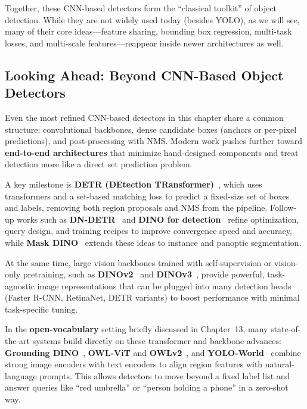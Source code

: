 Together, these CNN-based detectors form the “classical toolkit” of object detection. While they are not widely used today (besides YOLO), as we will see, many of their core ideas—feature sharing, bounding box regression, multi-task losses, and multi-scale features—reappear inside newer architectures as well.

\newpage

\subsection{Looking Ahead: Beyond CNN-Based Object Detectors}
\label{subsec:chapter14_future_object_detection}

Even the most refined CNN-based detectors in this chapter share a common structure: convolutional backbones, dense candidate boxes (anchors or per-pixel predictions), and post-processing with NMS. Modern work pushes further toward \textbf{end-to-end architectures} that minimize hand-designed components and treat detection more like a direct set prediction problem.

A key milestone is \textbf{DETR (DEtection TRansformer)}~\cite{carion2020_detr}, which uses transformers and a set-based matching loss to predict a fixed-size set of boxes and labels, removing both region proposals and NMS from the pipeline. Follow-up works such as \textbf{DN-DETR}~\cite{li2022_dn_detr} and \textbf{DINO for detection}~\cite{zhang2022_dino} refine optimization, query design, and training recipes to improve convergence speed and accuracy, while \textbf{Mask DINO}~\cite{li2022_maskdino} extends these ideas to instance and panoptic segmentation.

At the same time, large vision backbones trained with self-supervision or vision-only pretraining, such as \textbf{DINOv2}~\cite{oquab2023_dinov2} and \textbf{DINOv3}~\cite{simeoni2025_dinov3}, provide powerful, task-agnostic image representations that can be plugged into many detection heads (Faster R-CNN, RetinaNet, DETR variants) to boost performance with minimal task-specific tuning.

In the \textbf{open-vocabulary} setting briefly discussed in Chapter~13, many state-of-the-art systems build directly on these transformer and backbone advances: \textbf{Grounding DINO}~\cite{liu2023_groundingdino}, \textbf{OWL-ViT} and \textbf{OWLv2}~\cite{minderer2022_owlvit,minderer2024_owlv2}, and \textbf{YOLO-World}~\cite{cheng2024_yoloworld} combine strong image encoders with text encoders to align region features with natural-language prompts. This allows detectors to move beyond a fixed label list and answer queries like “red umbrella” or “person holding a phone” in a zero-shot way.

